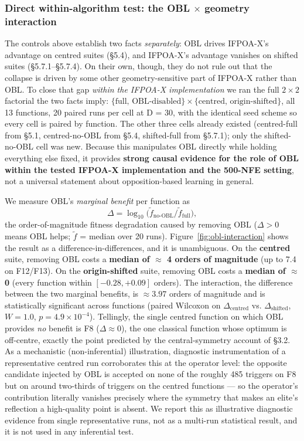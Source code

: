 \documentclass[preprint,12pt]{elsarticle}
\begin{document}
\subsubsection{Direct within-algorithm test: the OBL $\times$ geometry interaction}
\label{subsubsec5-7-5}

The controls above establish two facts \emph{separately}: OBL drives IFPOA-X's advantage on centred suites (\S5.4), and IFPOA-X's advantage vanishes on shifted suites (\S5.7.1--\S5.7.4). On their own, though, they do not rule out that the collapse is driven by some other geometry-sensitive part of IFPOA-X rather than OBL. To close that gap \emph{within the IFPOA-X implementation} we ran the full $2\times 2$ factorial the two facts imply: $\{\text{full, OBL-disabled}\} \times \{\text{centred, origin-shifted}\}$, all 13 functions, 20 paired runs per cell at D = 30, with the identical seed scheme so every cell is paired by function. The other three cells already existed (centred-full from \S5.1, centred-no-OBL from \S5.4, shifted-full from \S5.7.1); only the shifted-no-OBL cell was new. Because this manipulates OBL directly while holding everything else fixed, it provides \textbf{strong causal evidence for the role of OBL within the tested IFPOA-X implementation and the 500-NFE setting}, not a universal statement about opposition-based learning in general.

We measure OBL's \emph{marginal benefit} per function as
\[
\Delta = \log_{10}\!\big(\tilde f_{\text{no-OBL}} / \tilde f_{\text{full}}\big),
\]
the order-of-magnitude fitness degradation caused by removing OBL ($\Delta > 0$ means OBL helps; $\tilde f$ = median over 20 runs). Figure~\ref{fig:obl-interaction} shows the result as a difference-in-differences, and it is unambiguous. On the \textbf{centred} suite, removing OBL costs a \textbf{median of $\approx$ 4 orders of magnitude} (up to 7.4 on F12/F13). On the \textbf{origin-shifted} suite, removing OBL costs a \textbf{median of $\approx$ 0} (every function within $[-0.28, +0.09]$ orders). The interaction, the difference between the two marginal benefits, is $\approx 3.97$ orders of magnitude and is statistically significant across functions (paired Wilcoxon on $\Delta_{\text{centred}}$ vs. $\Delta_{\text{shifted}}$, $W = 1.0$, $p = 4.9\times10^{-4}$). Tellingly, the single centred function on which OBL provides \emph{no} benefit is F8 ($\Delta \approx 0$), the one classical function whose optimum is off-centre, exactly the point predicted by the central-symmetry account of \S3.2. As a mechanistic (non-inferential) illustration, diagnostic instrumentation of a representative centred run corroborates this at the operator level: the opposite candidate injected by OBL is accepted on none of the roughly 485 triggers on F8 but on around two-thirds of triggers on the centred functions --- so the operator's contribution literally vanishes precisely where the symmetry that makes an elite's reflection a high-quality point is absent. We report this as illustrative diagnostic evidence from single representative runs, not as a multi-run statistical result, and it is not used in any inferential test.
\end{document}
